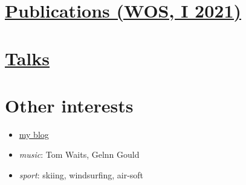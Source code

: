 \hypertarget{publications-wos-i-2021}{%
\section{\texorpdfstring{\href{./0pl.html}{Publications (WOS, I
2021)}}{Publications (WOS, I 2021)}}\label{publications-wos-i-2021}}

\hypertarget{talks}{%
\section{\texorpdfstring{\href{./00pl.html}{Talks}}{Talks}}\label{talks}}

\hypertarget{other-interests}{%
\section{Other interests}\label{other-interests}}

\begin{itemize}
\tightlist
\item
  \href{https://kacpertopol.github.io/myblog/}{my blog}
\item
  \emph{music}: Tom Waits, Gelnn Gould
\item
  \emph{sport}: skiing, windsurfing, air-soft
\end{itemize}

